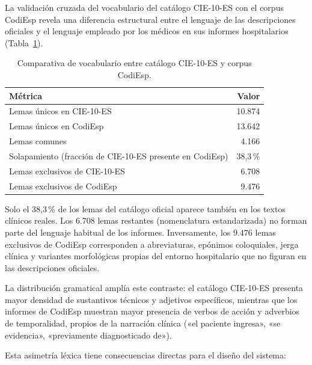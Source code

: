 La validación cruzada del vocabulario del catálogo CIE-10-ES con el corpus CodiEsp revela una diferencia estructural entre el lenguaje de las descripciones oficiales y el lenguaje empleado por los médicos en sus informes hospitalarios (Tabla~\ref{tab:vocab-gap}).

\begin{table}[h]
\centering
\caption{Comparativa de vocabulario entre catálogo CIE-10-ES y corpus CodiEsp.}
\label{tab:vocab-gap}
\begin{tabular}{lr}
\hline
\textbf{Métrica} & \textbf{Valor} \\
\hline
Lemas únicos en CIE-10-ES & 10.874 \\
Lemas únicos en CodiEsp & 13.642 \\
Lemas comunes & 4.166 \\
Solapamiento (fracción de CIE-10-ES presente en CodiEsp) & 38{,}3\,\% \\
Lemas exclusivos de CIE-10-ES & 6.708 \\
Lemas exclusivos de CodiEsp & 9.476 \\
\hline
\end{tabular}
\end{table}

Solo el 38,3\,\% de los lemas del catálogo oficial aparece también en los textos clínicos reales. Los 6.708 lemas restantes (nomenclatura estandarizada) no forman parte del lenguaje habitual de los informes. Inversamente, los 9.476 lemas exclusivos de CodiEsp corresponden a abreviaturas, epónimos coloquiales, jerga clínica y variantes morfológicas propias del entorno hospitalario que no figuran en las descripciones oficiales.

La distribución gramatical amplía este contraste: el catálogo CIE-10-ES presenta mayor densidad de sustantivos técnicos y adjetivos específicos, mientras que los informes de CodiEsp muestran mayor presencia de verbos de acción y adverbios de temporalidad, propios de la narración clínica («el paciente ingresa», «se evidencia», «previamente diagnosticado de»).

Esta asimetría léxica tiene consecuencias directas para el diseño del sistema:

